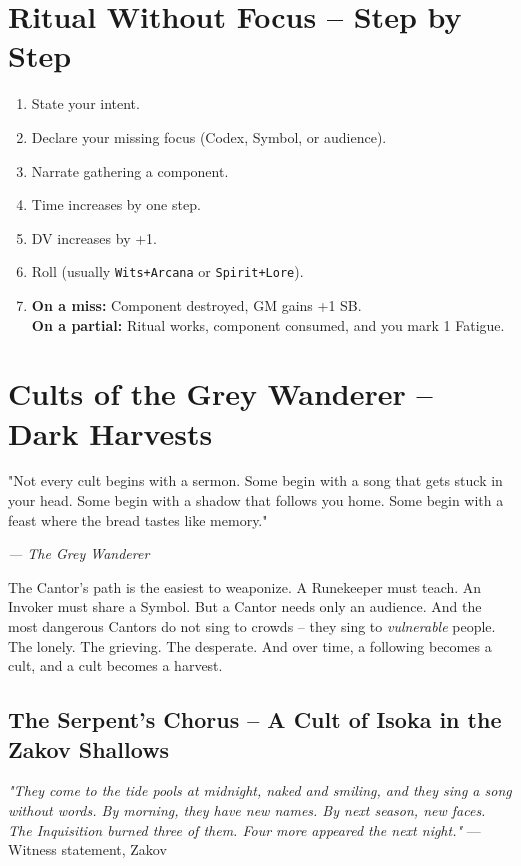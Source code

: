 \documentclass[10pt,a5paper]{book}
\begin{document}
\section{Ritual Without Focus -- Step by Step}
\begin{enumerate}
    \item State your intent.
    \item Declare your missing focus (Codex, Symbol, or audience).
    \item Narrate gathering a component.
    \item Time increases by one step.
    \item DV increases by +1.
    \item Roll (usually \texttt{Wits+Arcana} or \texttt{Spirit+Lore}).
    \item \textbf{On a miss:} Component destroyed, GM gains +1 SB. \\
          \textbf{On a partial:} Ritual works, component consumed, and you mark 1 Fatigue.
\end{enumerate}

\clearpage


\section{Cults of the Grey Wanderer -- Dark Harvests}

\epigraph{"Not every cult begins with a sermon. Some begin with a song that gets stuck in your head. Some begin with a shadow that follows you home. Some begin with a feast where the bread tastes like memory."}{\textit{--- The Grey Wanderer}}

The Cantor's path is the easiest to weaponize. A Runekeeper must teach. An Invoker must share a Symbol. But a Cantor needs only an audience. And the most dangerous Cantors do not sing to crowds -- they sing to \textit{vulnerable} people. The lonely. The grieving. The desperate. And over time, a following becomes a cult, and a cult becomes a harvest.

\subsection{The Serpent's Chorus -- A Cult of Isoka in the Zakov Shallows}

\textit{"They come to the tide pools at midnight, naked and smiling, and they sing a song without words. By morning, they have new names. By next season, new faces. The Inquisition burned three of them. Four more appeared the next night."} --- Witness statement, Zakov
\end{document}
